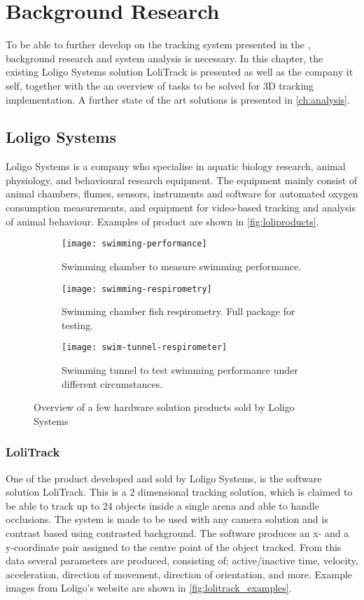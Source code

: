 \graphicspath{{figures/research/}}
\chapter{Background Research}\glsresetall
\label{cha:research}
To be able to further develop on the tracking system presented in the , background research and system analysis is necessary. In this chapter, the existing Loligo Systems solution LoliTrack is presented as well as the company it self, together with the an overview of tasks to be solved for 3D tracking implementation. A further state of the art solutions is presented in \autoref{ch:analysis}.

\section{Loligo Systems}\label{sec:loligo_res}
Loligo Systems is a company who specialise in aquatic biology research, animal physiology, and  behavioural research equipment. The equipment mainly consist of animal chambers, flumes, sensors, instruments and software for automated oxygen consumption measurements, and equipment for video-based tracking and analysis of animal behaviour. Examples of product are shown in \autoref{fig:loliproducts}.

\begin{figure}[H]
	\centering
	\begin{subfigure}{0.33\textwidth}
		\texttt{[image: swimming-performance]}
		\caption{Swimming chamber to measure swimming performance.}
	\end{subfigure}
	\begin{subfigure}{0.33\textwidth}
		\texttt{[image: swimming-respirometry]}
		\caption{Swimming chamber fish respirometry. Full package for testing.}
	\end{subfigure}
	\begin{subfigure}{0.32\textwidth}
		\texttt{[image: swim-tunnel-respirometer]}
		\caption{Swimming tunnel to test swimming performance under different circumstances.}
	\end{subfigure}
\caption{Overview of a few hardware solution products sold by Loligo Systems}
\label{fig:loliproducts}
\end{figure}

\subsection{LoliTrack}
One of the product developed and sold by Loligo Systems, is the software solution LoliTrack. This is a 2 dimensional tracking solution, which is claimed to be able to track up to 24 objects inside a single arena and able to handle occlusions. The system is made to be used with any camera solution and is contrast based using contrasted background. The software produces an x- and a y-coordinate pair assigned to the centre point of the object tracked. From this data several parameters are produced, consisting of; active/inactive time, velocity, acceleration, direction of movement, direction of orientation, and more. Example images from Loligo's website are shown in \autoref{fig:lolitrack_examples}.

